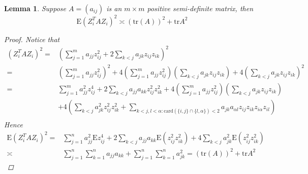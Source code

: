 \documentclass[review]{elsarticle}
\theoremstyle{plain}
\newtheorem{lemma}{Lemma}
\theoremstyle{definition}
\theoremstyle{remark}
\begin{document}
\begin{lemma}\label{lemmaQ}
    Suppose $A=(a_{ij})$ is an $m\times m$ positive semi-definite matrix, then
    \begin{equation}
        \mathrm{E} {(Z_i^T A Z_i)}^2\asymp (\mathrm{tr}(A))^2+\mathrm{tr}A^2
    \end{equation}
\begin{proof}
Notice that
\begin{equation}
    \begin{aligned}
        {(Z_i^T A Z_i)}^2
        =&
        (\sum_{j=1}^m a_{jj}z_{ij}^2+2\sum_{k<j}a_{jk}z_{ij}z_{ik})^2\\
        =&
        (\sum_{j=1}^m a_{jj}z_{ij}^2)^2+
        4(\sum_{j=1}^m a_{jj}z_{ij}^2)(\sum_{k<j}a_{jk}z_{ij}z_{ik})+
        4(\sum_{k<j}a_{jk}z_{ij}z_{ik})^2\\
        =&
        \sum_{j=1}^m a_{jj}^2z_{ij}^4+2\sum_{k<j}a_{jj}a_{kk}z_{ij}^2 z_{ik}^2+
        4(\sum_{j=1}^m a_{jj}z_{ij}^2)(\sum_{k<j}a_{jk}z_{ij}z_{ik})\\
        &+
        4(\sum_{k<j}a_{jk}^2z_{ij}^2z_{ik}^2+\sum_{k<j,l<\alpha:\mathrm{card}(\{i,j\}\cap\{l,\alpha\})<2} a_{jk}a_{\alpha l}z_{ij}z_{ik}z_{i\alpha}z_{il})\\
    \end{aligned}
\end{equation}
Hence
\begin{equation}
    \begin{aligned}
        \mathrm{E}{(Z_i^T A Z_i)}^2
        =&
        \sum_{j=1}^n a_{jj}^2 \mathrm{E}z_{ij}^4+2\sum_{k<j}a_{jj}a_{kk}\mathrm{E}(z_{ij}^2 z_{ik}^2)+
        4\sum_{k<j}a_{jk}^2 \mathrm{E}(z_{ij}^2z_{ik}^2)\\
        \asymp &
        \sum_{j=1}^n\sum_{k=1}^n a_{jj}a_{kk}+
        \sum_{j=1}^n\sum_{k=1}^n a_{jk}^2
        ={(\mathrm{tr}(A))}^2+\mathrm{tr}A^2
    \end{aligned}
\end{equation}

\end{proof}
\end{lemma}
\end{document}
